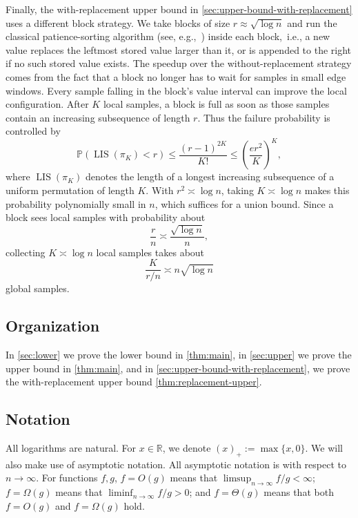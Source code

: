 \documentclass[11pt,reqno,letterpaper]{amsart}
\theoremstyle{definition}
\numberwithin{equation}{section}
\renewcommand{\P}{\mathbb{P}}
\newcommand{\mb}{\mathbb}
\DeclareMathOperator{\LIS}{LIS}
\begin{document}
Finally, the with-replacement upper bound in
\cref{sec:upper-bound-with-replacement} uses a different block strategy.  We take
blocks of size $r \approx \sqrt{\log n}$
and run the classical patience-sorting algorithm (see, e.g.,~\cite{AldousDiaconis99}) inside each block,~i.e., a new value replaces the
leftmost stored value larger than it, or is appended to the right if no such stored value
exists.  The speedup over the without-replacement strategy comes from the fact
that a block no longer has to wait for samples in small edge windows.  Every
sample falling in the block's value interval can improve the local configuration.
After \(K\) local samples, a block is full as soon as those samples contain an
increasing subsequence of length \(r\).  Thus the failure probability is
controlled by
\[
\P(\LIS(\pi_K)<r)
\le
\frac{(r-1)^{2K}}{K!}
\le
\left(\frac{er^2}{K}\right)^K,
\]
where $\LIS(\pi_K)$ denotes the length of a longest increasing subsequence of a uniform permutation of length $K$. 
With \(r^2\asymp\log n\), taking \(K \asymp \log n\) makes this probability
polynomially small in \(n\), which suffices for a union bound. Since a
block sees local samples with probability about
\[
\frac{r}{n}\asymp \frac{\sqrt{\log n}}{n},
\]
collecting \(K\asymp\log n\) local samples takes about
\[
\frac{K}{r/n}\asymp n\sqrt{\log n}
\]
global samples.  
\subsection{Organization}

In \cref{sec:lower} we prove the lower bound in \cref{thm:main}, in \cref{sec:upper} we prove the upper bound in \cref{thm:main}, and in \cref{sec:upper-bound-with-replacement}, we prove the with-replacement upper bound \cref{thm:replacement-upper}.

\subsection{Notation}
All logarithms are natural. For $x \in \mb{R}$, we denote $(x)_+ := \max\{x,0\}$.
We will also make use of asymptotic notation. All asymptotic notation is with respect to $n \to \infty$. For functions $f,g$, $f = O(g)$ means that $\limsup_{n\to\infty} f/g < \infty$; $f = \Omega(g)$  means that $\liminf_{n\to\infty} f/g > 0$; and $f = \Theta(g)$ means that both $f = O(g)$ and $f = \Omega(g)$ hold.%
\end{document}
